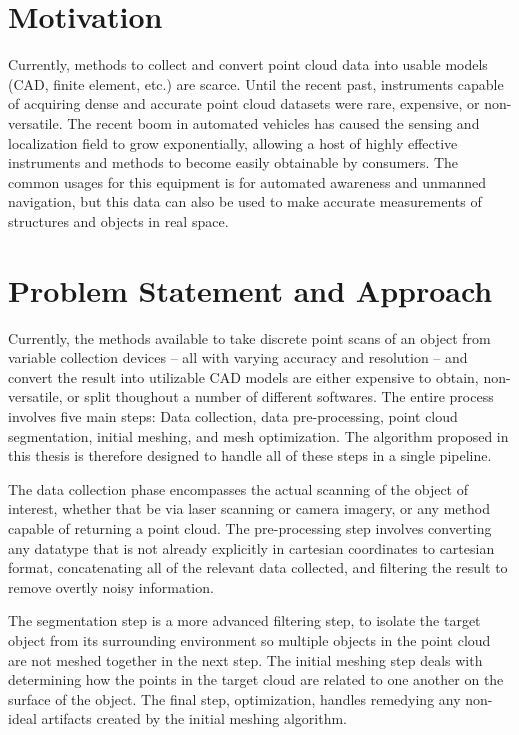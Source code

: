 \documentclass[12pt]{drexelthesis}
\let\Oldsection\section
\renewcommand{\section}{\FloatBarrier\Oldsection}
\begin{document}
\section{Motivation}
Currently, methods to collect and convert point cloud data into usable models (CAD, finite element, etc.) are scarce. Until the recent past, instruments capable of acquiring dense and accurate point cloud datasets were rare, expensive, or non-versatile. The recent boom in automated vehicles has caused the sensing and localization field to grow exponentially, allowing a host of highly effective instruments and methods to become easily obtainable by consumers. The common usages for this equipment is for automated awareness and unmanned navigation, but this data can also be used to make accurate measurements of structures and objects in real space.

\section{Problem Statement and Approach}
Currently, the methods available to take discrete point scans of an object from variable collection devices -- all with varying accuracy and resolution -- and convert the result into utilizable CAD models are either expensive to obtain, non-versatile, or split thoughout a number of different softwares. The entire process involves five main steps: Data collection, data pre-processing, point cloud segmentation, initial meshing, and mesh optimization. The algorithm proposed in this thesis is therefore designed to handle all of these steps in a single pipeline.

The data collection phase encompasses the actual scanning of the object of interest, whether that be via laser scanning or camera imagery, or any method capable of returning a point cloud. The pre-processing step involves converting any datatype that is not already explicitly in cartesian coordinates to cartesian format, concatenating all of the relevant data collected, and filtering the result to remove overtly noisy information.

The segmentation step is a more advanced filtering step, to isolate the target object from its surrounding environment so multiple objects in the point cloud are not meshed together in the next step. The initial meshing step deals with determining how the points in the target cloud are related to one another on the surface of the object. The final step, optimization, handles remedying any non-ideal artifacts created by the initial meshing algorithm.
\end{document}

